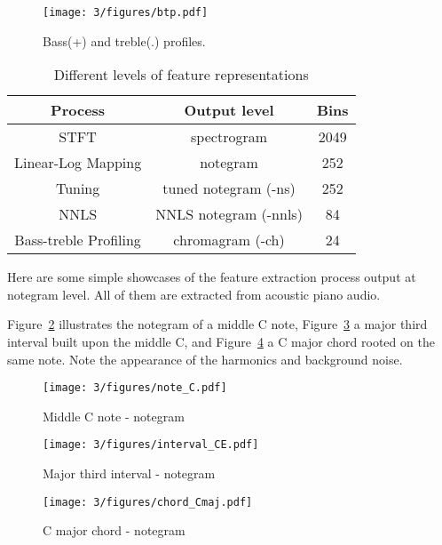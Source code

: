 \begin{figure}[htb]
\centering
\texttt{[image: 3/figures/btp.pdf]}
\caption{Bass(+) and treble(.) profiles.}
\label{fig:3-btprofile}
\end{figure}

\begin{table}[htb]
\caption{Different levels of feature representations}
\centering
\footnotesize
\begin{tabular}{|c|c|c|} \hline
 Process & Output level & Bins \\ \hline
 STFT & spectrogram & 2049 \\ \hline
 Linear-Log Mapping & notegram & 252  \\ \hline
 Tuning & tuned notegram (-ns) & 252 \\ \hline
 NNLS & NNLS notegram (-nnls) & 84  \\ \hline
 Bass-treble Profiling & chromagram (-ch) & 24 \\ \hline
\end{tabular}
\label{tab:3-felevels}
\end{table}

Here are some simple showcases of the feature extraction process output at notegram level. All of them are extracted from acoustic piano audio.

Figure~\ref{fig:3-note_C} illustrates the notegram of a middle C note, Figure~\ref{fig:3-interval_CE} a major third interval built upon the middle C, and Figure~\ref{fig:3-chord_Cmaj} a C major chord rooted on the same note. Note the appearance of the harmonics and background noise.

\begin{figure}
\centering
\texttt{[image: 3/figures/note\_C.pdf]}
\caption{Middle C note - notegram}
\label{fig:3-note_C}
\end{figure}

\begin{figure}
\centering
\texttt{[image: 3/figures/interval\_CE.pdf]}
\caption{Major third interval - notegram}
\label{fig:3-interval_CE}
\end{figure}

\begin{figure}
\centering
\texttt{[image: 3/figures/chord\_Cmaj.pdf]}
\caption{C major chord - notegram}
\label{fig:3-chord_Cmaj}
\end{figure}


